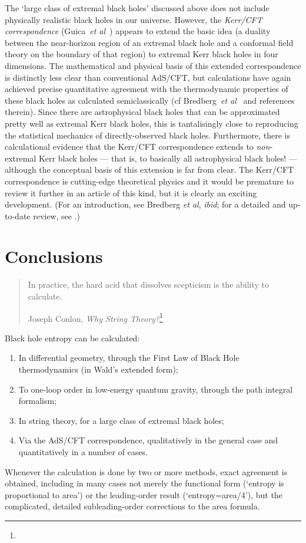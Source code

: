 \documentclass[12pt]{article}
\begin{document}
The `large class of extremal black holes' discussed above does not include physically realistic black holes in our universe. However, the \emph{Kerr/CFT correspondence} (Guica~\emph{et al}~) appears to extend the basic idea (a duality between the near-horizon region of an extremal black hole and a conformal field theory on the boundary of that region) to extremal Kerr black holes in four dimensions. The mathematical and physical basis of this extended  correspondence is distinctly less clear than conventional AdS/CFT, but calculations have again achieved precise quantitative agreement with the thermodynamic properties of these black holes as calculated semiclassically (cf Bredberg~\emph{et al}~\citeyear{bredbergetal} and references therein). Since there are astrophysical black holes that can be approximated pretty well as extremal Kerr black holes, this is tantalisingly close to reproducing the statistical mechanics of directly-observed black holes. Furthermore, there is calculational evidence that the Kerr/CFT correspondence extends to \emph{non}-extremal Kerr black holes --- that is, to basically all astrophysical black holes! --- although the conceptual basis of this extension is far from clear. The Kerr/CFT correspondence is cutting-edge theoretical physics and it would be premature to review it further in an article of this kind, but it is clearly an exciting development. (For an introduction, see Bredberg \emph{et al}, \emph{ibid}; for a detailed and up-to-date review, see .)

\section{Conclusions}\label{conclusion}

\begin{quote}
In practice, the hard acid that dissolves scepticism is the ability to calculate.

\begin{flushright}
Joseph Conlon, \emph{Why String Theory?}\footnote{}
\end{flushright}
\end{quote}
Black hole entropy can be calculated:
\begin{enumerate}
\item In differential geometry, through the First Law of Black Hole thermodynamics (in Wald's extended form);
\item To one-loop order in low-energy quantum gravity, through the path integral formalism;
\item In string theory, for a large class of extremal black holes;
\item Via the AdS/CFT correspondence, qualitatively in the general case and quantitatively in a number of cases.
\end{enumerate}
Whenever the calculation is done by two or more methods, exact agreement is obtained, including in many cases not merely the functional form (`entropy is proportional to area') or the leading-order result (`entropy=area/4'), but the complicated, detailed subleading-order corrections to the area formula.
\end{document}
